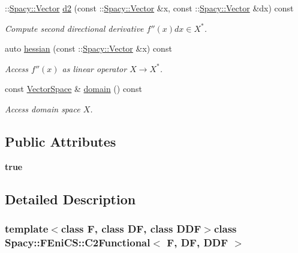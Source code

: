 \begin{DoxyCompactItemize}
\-::\hyperlink{classSpacy_1_1Vector}{Spacy\-::\-Vector} \hyperlink{classSpacy_1_1FEniCS_1_1C2Functional_affc6728db99f20f57ce75f16799084b4}{d2} (const \-::\hyperlink{classSpacy_1_1Vector}{Spacy\-::\-Vector} \&x, const \-::\hyperlink{classSpacy_1_1Vector}{Spacy\-::\-Vector} \&dx) const 
\begin{DoxyCompactList}\small\item\em Compute second directional derivative $f''(x)dx\in X^* $. \end{DoxyCompactList}\item 
auto \hyperlink{classSpacy_1_1FEniCS_1_1C2Functional_aceec6783f701e121b35ffa482629e1dd}{hessian} (const \-::\hyperlink{classSpacy_1_1Vector}{Spacy\-::\-Vector} \&x) const 
\begin{DoxyCompactList}\small\item\em Access $f''(x)$ as linear operator $X\rightarrow X^*$. \end{DoxyCompactList}\item 
\hypertarget{classSpacy_1_1FunctionalBase_a2d3397deb9fa1ad85ed04e37a03b3aa6}{const \hyperlink{classSpacy_1_1VectorSpace}{Vector\-Space} \& \hyperlink{classSpacy_1_1FunctionalBase_a2d3397deb9fa1ad85ed04e37a03b3aa6}{domain} () const }\label{classSpacy_1_1FunctionalBase_a2d3397deb9fa1ad85ed04e37a03b3aa6}

\begin{DoxyCompactList}\small\item\em Access domain space $X$. \end{DoxyCompactList}\end{DoxyCompactItemize}
\subsection*{Public Attributes}
\begin{DoxyCompactItemize}
\item 
{\bfseries true}
\end{DoxyCompactItemize}


\subsection{Detailed Description}
\subsubsection*{template$<$class F, class D\-F, class D\-D\-F$>$class Spacy\-::\-F\-Eni\-C\-S\-::\-C2\-Functional$<$ F, D\-F, D\-D\-F $>$}


